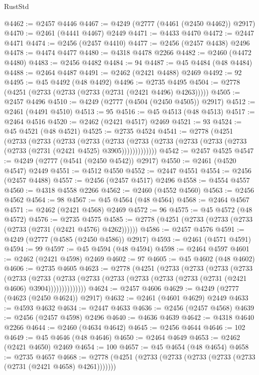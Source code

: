 \begin{lexlean}{RustStd}
\begin{coremodule}
@4462 := @2457 @4446
@4467 := @4249 (@2777 (@4461 (@2450 @4462)) @2917)
@4470 := @2461 (@4441 @4467) @2449
@4471 := @4433 @4470
@4472 := @2447 @4471
@4474 := @2456 (@2457 @4410)
@4477 := @2456 (@2457 @4438) @2496
@4478 := @4474 @4477
@4480 := @4318 @4478 @2266
@4482 := @2460 (@4472 @4480)
@4483 := @2456 @4482
@4484 := 94
@4487 := @45 @4484 (@48 @4484)
@4488 := @2464 @4487
@4491 := @2462 (@2421 @4488) @2469
@4492 := 92
@4495 := @45 @4492 (@48 @4492)
@4496 := @2735 @4495
@4504 := @2778 (@4251 (@2733 (@2733 (@2733 (@2731 (@2421 @4496) @4263)))))
@4505 := @2457 @4496
@4510 := @4249 (@2777 (@4504 (@2450 @4505)) @2917)
@4512 := @2461 (@4491 @4510)
@4513 := 95
@4516 := @45 @4513 (@48 @4513)
@4517 := @2464 @4516
@4520 := @2462 (@2421 @4517) @2469
@4521 := 93
@4524 := @45 @4521 (@48 @4521)
@4525 := @2735 @4524
@4541 := @2778
    (@4251
      (@2733
        (@2733
          (@2733
            (@2733
              (@2733
                (@2733 (@2733 (@2733 (@2733 (@2733 (@2733 (@2731 (@2421 @4525) @3905)))))))))))))
@4542 := @2457 @4525
@4547 := @4249 (@2777 (@4541 (@2450 @4542)) @2917)
@4550 := @2461 (@4520 @4547) @2449
@4551 := @4512 @4550
@4552 := @2447 @4551
@4554 := @2456 (@2457 @4488)
@4557 := @2456 (@2457 @4517) @2496
@4558 := @4554 @4557
@4560 := @4318 @4558 @2266
@4562 := @2460 (@4552 @4560)
@4563 := @2456 @4562
@4564 := 98
@4567 := @45 @4564 (@48 @4564)
@4568 := @2464 @4567
@4571 := @2462 (@2421 @4568) @2469
@4572 := 96
@4575 := @45 @4572 (@48 @4572)
@4576 := @2735 @4575
@4585 := @2778 (@4251 (@2733 (@2733 (@2733 (@2733 (@2731 (@2421 @4576) @4262))))))
@4586 := @2457 @4576
@4591 := @4249 (@2777 (@4585 (@2450 @4586)) @2917)
@4593 := @2461 (@4571 @4591)
@4594 := 99
@4597 := @45 @4594 (@48 @4594)
@4598 := @2464 @4597
@4601 := @2462 (@2421 @4598) @2469
@4602 := 97
@4605 := @45 @4602 (@48 @4602)
@4606 := @2735 @4605
@4623 := @2778
    (@4251
      (@2733
        (@2733
          (@2733
            (@2733
              (@2733
                (@2733
                  (@2733 (@2733 (@2733 (@2733 (@2733 (@2733 (@2731 (@2421 @4606) @3904))))))))))))))
@4624 := @2457 @4606
@4629 := @4249 (@2777 (@4623 (@2450 @4624)) @2917)
@4632 := @2461 (@4601 @4629) @2449
@4633 := @4593 @4632
@4634 := @2447 @4633
@4636 := @2456 (@2457 @4568)
@4639 := @2456 (@2457 @4598) @2496
@4640 := @4636 @4639
@4642 := @4318 @4640 @2266
@4644 := @2460 (@4634 @4642)
@4645 := @2456 @4644
@4646 := 102
@4649 := @45 @4646 (@48 @4646)
@4650 := @2464 @4649
@4653 := @2462 (@2421 @4650) @2469
@4654 := 100
@4657 := @45 @4654 (@48 @4654)
@4658 := @2735 @4657
@4668 := @2778 (@4251 (@2733 (@2733 (@2733 (@2733 (@2733 (@2731 (@2421 @4658) @4261)))))))

\end{coremodule}
\end{lexlean}
